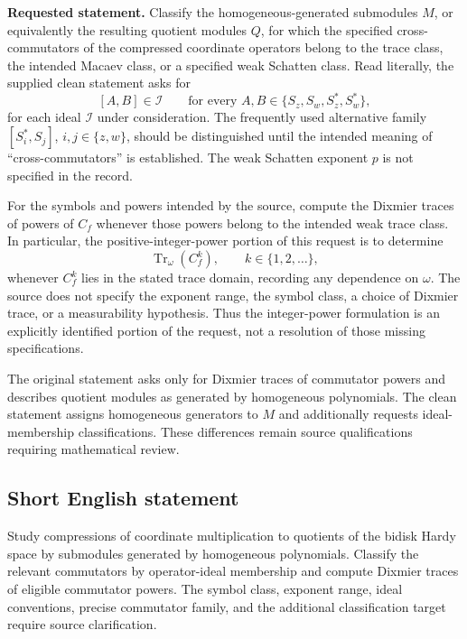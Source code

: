\documentclass[11pt]{article}
\begin{document}
\textbf{Requested statement.} Classify the homogeneous-generated submodules \(M\), or equivalently the resulting quotient modules \(Q\), for which the specified cross-commutators of the compressed coordinate operators belong to the trace class, the intended Macaev class, or a specified weak Schatten class. Read literally, the supplied clean statement asks for
\[
[A,B]\in\mathcal I\qquad\text{for every }A,B\in\{S_z,S_w,S_z^*,S_w^*\},
\]
for each ideal \(\mathcal I\) under consideration. The frequently used alternative family \([S_i^*,S_j]\), \(i,j\in\{z,w\}\), should be distinguished until the intended meaning of ``cross-commutators'' is established. The weak Schatten exponent \(p\) is not specified in the record.

For the symbols and powers intended by the source, compute the Dixmier traces of powers of \(C_f\) whenever those powers belong to the intended weak trace class. In particular, the positive-integer-power portion of this request is to determine
\[
\operatorname{Tr}_{\omega}(C_f^k),\qquad k\in\{1,2,\ldots\},
\]
whenever \(C_f^k\) lies in the stated trace domain, recording any dependence on \(\omega\). The source does not specify the exponent range, the symbol class, a choice of Dixmier trace, or a measurability hypothesis. Thus the integer-power formulation is an explicitly identified portion of the request, not a resolution of those missing specifications.

The original statement asks only for Dixmier traces of commutator powers and describes quotient modules as generated by homogeneous polynomials. The clean statement assigns homogeneous generators to \(M\) and additionally requests ideal-membership classifications. These differences remain source qualifications requiring mathematical review.
\subsection{Short English statement}
Study compressions of coordinate multiplication to quotients of the bidisk Hardy space by submodules generated by homogeneous polynomials. Classify the relevant commutators by operator-ideal membership and compute Dixmier traces of eligible commutator powers. The symbol class, exponent range, ideal conventions, precise commutator family, and the additional classification target require source clarification.
\end{document}
